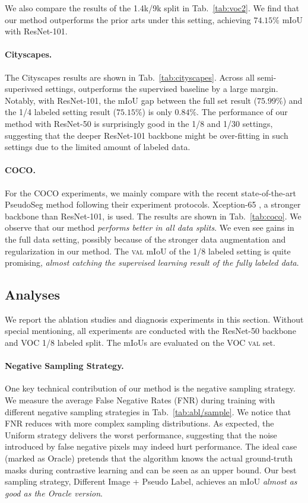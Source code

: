 We also compare the results of the 1.4k/9k split in Tab.~\ref{tab:voc2}.
We find that our method outperforms the prior arts under this setting, achieving $74.15\%$ mIoU with ResNet-101.


\paragraph{Cityscapes.}
The Cityscapes results are shown in Tab.~\ref{tab:cityscapes}. Across all semi-superivsed settings, \ours{} outperforms the supervised baseline by a large margin. Notably, with ResNet-101, the mIoU gap between the full set result ($75.99\%$) and the 1/4 labeled setting result ($75.15\%$) is only $0.84\%$. The performance of our method with ResNet-50 is surprisingly good in the 1/8 and 1/30 settings, suggesting that the deeper ResNet-101 backbone might be over-fitting in such settings due to the limited amount of labeled data.


\paragraph{COCO.}
For the COCO experiments, we mainly compare with the recent state-of-the-art PseudoSeg method \cite{zou2020pseudoseg} following their experiment protocols. Xception-65 \cite{chollet2017xception}, a stronger backbone than ResNet-101, is used. The results are shown in Tab.~\ref{tab:coco}. We observe that our method {\em performs better in all data splits}. We even see gains in the full data setting, possibly because of the stronger data augmentation and regularization in our method. The \textsc{val} mIoU of the 1/8 labeled setting is quite promising, {\em almost catching the supervised learning result of the fully labeled data}.



\subsection{Analyses}
\label{sec:exp/analysis}

We report the ablation studies and diagnosis experiments in this section. Without special mentioning, all experiments are conducted with the ResNet-50 backbone and VOC 1/8 labeled split. The mIoUs are evaluated on the VOC \textsc{val} set.


\paragraph{Negative Sampling Strategy.}
One key technical contribution of our method is the negative sampling strategy.
We measure the average False Negative Rates (FNR) during training with different negative sampling strategies in Tab.~\ref{tab:abl/sample}. 
We notice that FNR reduces with more complex sampling distributions. As expected, the Uniform strategy delivers the worst performance, suggesting that the noise introduced by false negative pixels may indeed hurt performance. The ideal case (marked as Oracle) pretends that the algorithm knows the actual ground-truth masks during contrastive learning and can be seen as an upper bound. Our best sampling strategy, Different Image + Pseudo Label, achieves an mIoU {\em almost as good as the Oracle version}.

